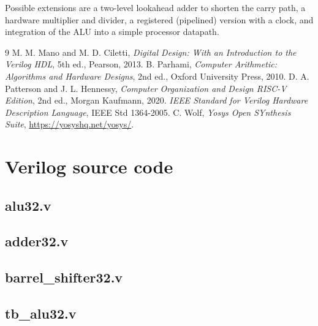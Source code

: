 \documentclass[11pt,a4paper]{article}
\begin{document}
Possible extensions are a two-level lookahead adder to shorten the carry path, a hardware multiplier and divider, a registered (pipelined) version with a clock, and integration of the ALU into a simple processor datapath.

\begin{thebibliography}{9}
 M. M. Mano and M. D. Ciletti, \emph{Digital Design: With an Introduction to the Verilog HDL}, 5th ed., Pearson, 2013.
 B. Parhami, \emph{Computer Arithmetic: Algorithms and Hardware Designs}, 2nd ed., Oxford University Press, 2010.
 D. A. Patterson and J. L. Hennessy, \emph{Computer Organization and Design RISC-V Edition}, 2nd ed., Morgan Kaufmann, 2020.
 \emph{IEEE Standard for Verilog Hardware Description Language}, IEEE Std 1364-2005.
 C. Wolf, \emph{Yosys Open SYnthesis Suite}, \url{https://yosyshq.net/yosys/}.
\end{thebibliography}

\appendix
\section{Verilog source code}
\subsection{alu32.v}

\subsection{adder32.v}

\subsection{barrel\_shifter32.v}

\subsection{tb\_alu32.v}

\end{document}
